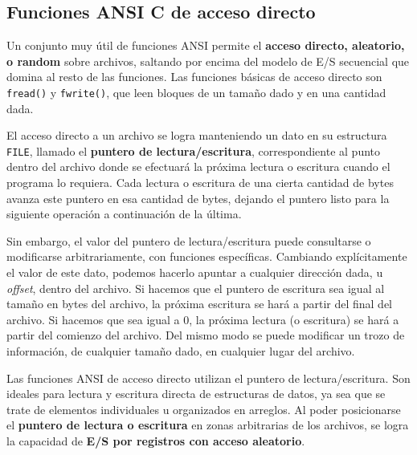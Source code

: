 \subsection{Funciones ANSI C de acceso directo}
\label{subsec:esarchivosansicdirect}

Un conjunto muy útil de funciones ANSI permite el \textbf{acceso directo, aleatorio, o
random} sobre archivos, saltando por encima del modelo de E/S secuencial que
domina al resto de las funciones. Las funciones básicas de acceso directo son
\lstinline{fread()} y \lstinline{fwrite()}, que leen bloques de un tamaño dado y en una cantidad dada.

El acceso directo a un archivo se logra manteniendo un dato en su estructura \lstinline{FILE}, 
llamado el \textbf{puntero de lectura/escritura},
correspondiente al punto dentro del archivo donde se efectuará la próxima lectura o escritura  
cuando el programa lo requiera. Cada lectura o escritura de una cierta cantidad de bytes
avanza este puntero en esa cantidad de bytes, dejando el puntero listo para la siguiente 
operación a continuación de la última.
 
Sin embargo, el valor del puntero de lectura/escritura puede consultarse o modificarse arbitrariamente, con funciones específicas. Cambiando explícitamente el valor de este dato, podemos hacerlo  
apuntar a cualquier dirección dada, u \textit{offset}, dentro del archivo. Si hacemos que el puntero de escritura sea 
igual al tamaño en bytes del archivo, la próxima escritura se hará a partir del final del
archivo. Si hacemos que sea igual a 0, la próxima lectura (o escritura) se hará a partir del comienzo del archivo. Del mismo modo se puede modificar un trozo de información, de cualquier tamaño dado, en cualquier lugar del archivo. 

Las funciones ANSI de acceso directo utilizan el puntero de lectura/escritura. Son ideales para lectura y escritura directa de estructuras de datos, ya sea que se trate de elementos individuales u organizados en arreglos. Al poder
posicionarse el \textbf{puntero de lectura o escritura} en zonas arbitrarias de los
archivos, se logra la capacidad de \textbf{E/S por registros con acceso aleatorio}.


